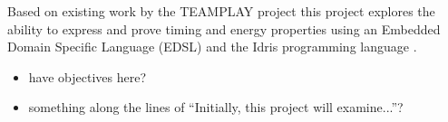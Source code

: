 Based on existing work by the TEAMPLAY project \cite{teamplay:d1.1} this project explores the ability to express and prove timing and energy properties using an Embedded Domain Specific Language (EDSL) and the Idris programming language \cite{brady_2013}.

\begin{itemize}
	\item have objectives here?
	\item something along the lines of ``Initially, this project will examine...''?
\end{itemize}